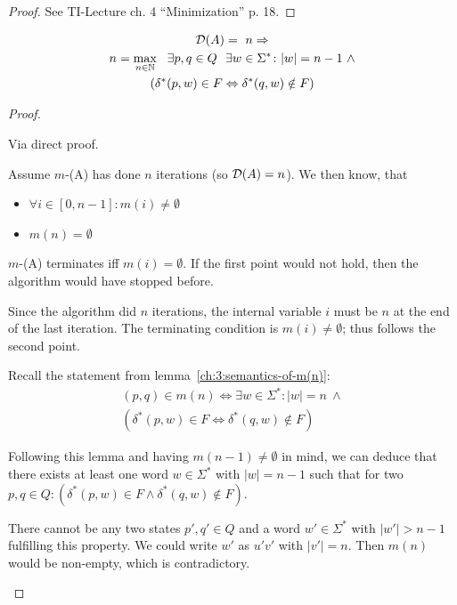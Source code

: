 \begin{proof}
	See TI-Lecture ch. 4 ``Minimization'' p. 18.
\end{proof}

\begin{lemma}[Semantics of $\mmD(A) = n$] \label{ch:3:semantics-of-D(A)}
	\begin{multline*}
		\mathcal{D}(A) =\ n \Rightarrow \\
		n = \max_{n \in \mathbb{N}}\ \ \exists p, q \in Q\ \ \exists w \in \Sigma^* \colon |w| = n - 1\ \land \\
		(\delta^*(p,w) \in F \Leftrightarrow \delta^*(q,w) \notin F)
	\end{multline*}
\end{lemma}

\begin{proof}
	\begin{description}
		\item
		
		Via direct proof.
		
		Assume $m$-\MinMark(A) has done $n$ iterations (so $\mmD(A) = n$). We then know, that
		\begin{itemize}
			\item $\forall i \in [0,n-1]\colon m(i) \neq \emptyset$
			\item $m(n)= \emptyset$
		\end{itemize}
		$m$-\MinMark(A) terminates iff $m(i) = \emptyset$. If the first point would not hold, then the algorithm would have stopped before.
		
		Since the algorithm did $n$ iterations, the internal variable $i$ must be $n$ at the end of the last iteration. The terminating condition is $m(i) \neq \emptyset$; thus follows the second point.
		
		Recall the statement from lemma~\ref{ch:3:semantics-of-m(n)}:
		\begin{multline*}
		(p,q) \in m(n) \Longleftrightarrow 
		\exists w\in\Sigma^*\colon |w| = n\ \land \\
		(\delta^*(p,w) \in F \Leftrightarrow \delta^*(q,w) \notin F)
		\end{multline*}
	
		
		Following this lemma and having $m(n-1) \neq \emptyset$ in mind, we can deduce that there exists at least one word $w\in\Sigma^*$ with $|w| = n-1$ such that for two $p,q \in Q\colon (\delta^*(p,w) \in F \land \delta^*(q,w) \notin F)$.
		
		
		There cannot be any two states $p',q'\in Q$ and a word $w'\in\Sigma^*$ with $|w'| > n-1$ fulfilling this property. We could write $w'$ as $u'v'$ with $|v'| = n$. Then $m(n)$ would be non-empty, which is contradictory.
	\end{description}
\end{proof}

